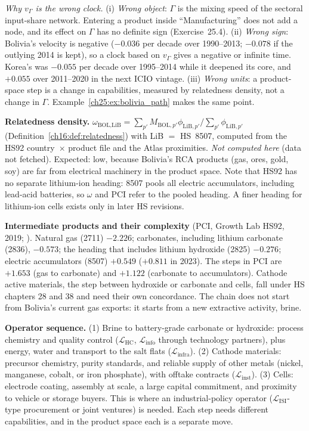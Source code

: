 \documentclass[../solutions_manual.tex]{subfiles}
\begin{document}
\emph{Why $v_\Gamma$ is the wrong clock.} (i) \emph{Wrong object}: $\Gamma$ is the mixing speed of the sectoral input-share network. Entering a product inside ``Manufacturing'' does not add a node, and its effect on $\Gamma$ has no definite sign (Exercise~25.4). (ii) \emph{Wrong sign}: Bolivia's velocity is negative ($-0.036$ per decade over 1990--2013; $-0.078$ if the outlying 2014 is kept), so a clock based on $v_\Gamma$ gives a negative or infinite time. Korea's was $-0.055$ per decade over 1995--2014 while it deepened its core, and $+0.055$ over 2011--2020 in the next ICIO vintage. (iii) \emph{Wrong units}: a product-space step is a change in capabilities, measured by relatedness density, not a change in $\Gamma$. Example~\ref{ch25:ex:bolivia_path} makes the same point.


 \textbf{Relatedness density.} $\omega_{\text{BOL},\text{LiB}} = \sum_{p'}M_{\text{BOL},p'}\phi_{\text{LiB},p'}/\sum_{p'}\phi_{\text{LiB},p'}$ (Definition~\ref{ch16:def:relatedness}) with LiB $=$ HS~8507, computed from the HS92 country~$\times$ product file and the Atlas proximities. \emph{Not computed here} (data not fetched). Expected: low, because Bolivia's RCA products (gas, ores, gold, soy) are far from electrical machinery in the product space. Note that HS92 has no separate lithium-ion heading: 8507 pools all electric accumulators, including lead-acid batteries, so $\omega$ and PCI refer to the pooled heading. A finer heading for lithium-ion cells exists only in later HS revisions.

 \textbf{Intermediate products and their complexity} (PCI, Growth Lab HS92, 2019; \citealp{growthlab2026atlas}). Natural gas (2711) $-2.226$; carbonates, including lithium carbonate (2836), $-0.573$; the heading that includes lithium hydroxide (2825) $-0.276$; electric accumulators (8507) $+0.549$ ($+0.811$ in 2023). The steps in PCI are $+1.653$ (gas to carbonate) and $+1.122$ (carbonate to accumulators). Cathode active materials, the step between hydroxide or carbonate and cells, fall under HS chapters 28 and 38 and need their own concordance. The chain does not start from Bolivia's current gas exports: it starts from a new extractive activity, brine.

 \textbf{Operator sequence.} (1) Brine to battery-grade carbonate or hydroxide: process chemistry and quality control ($\mathcal{L}_{\text{HC}}$, $\mathcal{L}_{\text{info}}$ through technology partners), plus energy, water and transport to the salt flats ($\mathcal{L}_{\text{infra}}$). (2) Cathode materials: precursor chemistry, purity standards, and reliable supply of other metals (nickel, manganese, cobalt, or iron phosphate), with offtake contracts ($\mathcal{L}_{\text{inst}}$). (3) Cells: electrode coating, assembly at scale, a large capital commitment, and proximity to vehicle or storage buyers. This is where an industrial-policy operator ($\mathcal{L}_{\text{ISI}}$-type procurement or joint ventures) is needed. Each step needs different capabilities, and in the product space each is a separate move.
\end{document}
